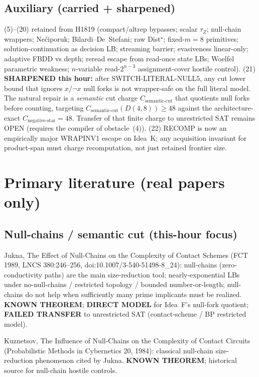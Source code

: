 \documentclass[11pt]{article}
\begin{document}
\subsection*{Auxiliary (carried + sharpened)}
(5)--(20) retained from H1819 (compact/altrep bypasses; scalar $\tau_Z$; null-chain wrappers;
Ne\v{c}iporuk; Bilardi--De~Stefani; raw Dist$^\star$; fixed-$m=8$ primitives; solution-continuation
as decision LB; streaming barrier; evasiveness linear-only; adaptive FBDD vs depth;
reread escape from read-once state LBs; Woelfel parametric weakness; $n$-variable
read-$2^{n-3}$ assignment-cover hostile control).
(21) \textbf{SHARPENED this hour:} after SWITCH-LITERAL-NULL5, any cut lower bound that
ignores $x/\neg x$ null forks is not wrapper-safe on the full literal model. The natural
repair is a \emph{semantic} cut charge
$C_{\mathrm{semantic\textrm{-}cut}}$ that quotients null forks before counting, targeting
$C_{\mathrm{semantic\textrm{-}cut}}(D(4,8))\ge 48$ against the architecture-exact
$C_{\mathrm{negative\textrm{-}star}}=48$. Transfer of that finite charge to unrestricted SAT
remains OPEN (requires the compiler of obstacle~(4)).
(22) RECOMP is now an empirically major WRAPINV1 escape on Idea~K; any acquisition
invariant for product-span must charge recomputation, not just retained frontier size.

\section*{Primary literature (real papers only)}
\subsection*{Null-chains / semantic cut (this-hour focus)}
Jukna, The Effect of Null-Chains on the Complexity of Contact Schemes
(FCT 1989, LNCS 380:246--256, doi:10.1007/3-540-51498-8\_24):
null-chains (zero-conductivity paths) are the main size-reduction tool; nearly-exponential
LBs under no-null-chains / restricted topology / bounded number-or-length; null-chains do
not help when sufficiently many prime implicants must be realized.
\textbf{KNOWN THEOREM}; \textbf{DIRECT MODEL} for Idea~F's null-fork quotient;
\textbf{FAILED TRANSFER} to unrestricted SAT (contact-scheme / BP restricted model).

Kuznetsov, The Influence of Null-Chains on the Complexity of Contact Circuits
(Probabilistic Methods in Cybernetics 20, 1984): classical null-chain size-reduction
phenomenon cited by Jukna.
\textbf{KNOWN THEOREM}; historical source for null-chain hostile controls.
\end{document}

